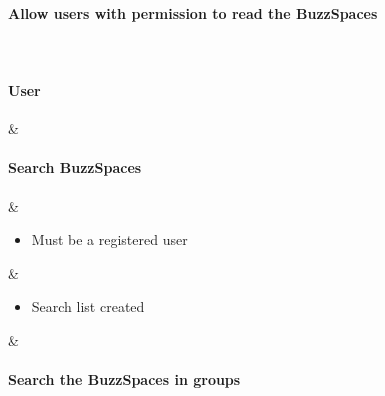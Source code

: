 \documentclass{article}
\begin{document}
\begin{table}
\begin{tabularx}{\textwidth}
			\paragraph{Allow users with permission to read the BuzzSpaces}
			\\
			\hline
			
			\paragraph{User}
			&
			\paragraph{Search BuzzSpaces}
			&
			\begin{itemize}
				\item Must be a registered user
			\end{itemize} &
			\begin{itemize}
				\item Search list created
			\end{itemize} &
			\paragraph{Search the BuzzSpaces in groups}
			\\
			\hline
			
			
		\end{tabularx}
	\end{table}

	
\end{document}
